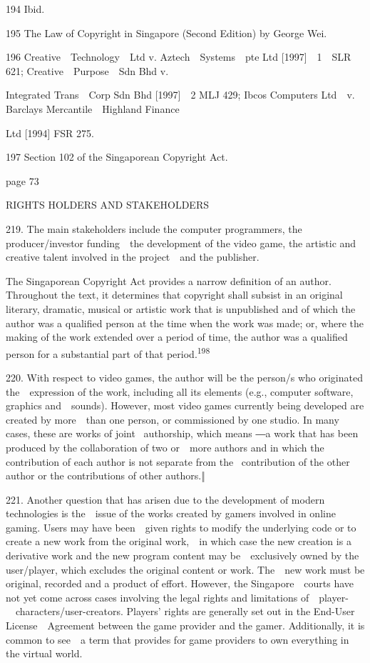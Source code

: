 \documentclass[
]{article}
\begin{document}
{194 }{Ibid.}

{195 }{The Law of Copyright in Singapore (Second Edition) }{by George
Wei.}

{196 }{Creative~~Technology~~Ltd v. Aztech~~Systems~~pte Ltd
}{{[}1997{]}~~1~~SLR 621; }{Creative~~Purpose~~Sdn Bhd v.}

{Integrated Trans~~Corp Sdn Bhd }{{[}1997{]}~~2 MLJ 429; }{Ibcos
Computers Ltd~~v. Barclays Mercantile~~Highland Finance}

{Ltd }{{[}1994{]} FSR 275.}

{197 }{Section 102 of the Singaporean }{Copyright Act}{.}

{page 73}

{RIGHTS HOLDERS AND STAKEHOLDERS}

{219. }{The main stakeholders include the computer programmers, the
producer/investor funding~~the development of the video game, the
artistic and creative talent involved in the project~~and the
publisher.}

{The Singaporean }{Copyright Act }{provides a narrow definition of an
author. Throughout the text, it determines that copyright shall subsist
in an original literary, dramatic, musical or artistic work that is
unpublished and of which the author was a qualified person at the time
when the work was made; or, where the making of the work extended over a
period of time, the author was a qualified person for a substantial part
of that period.}\textsuperscript{{198}}

{220. }{With respect to video games, the author will be the person/s who
originated the~~expression of the work, including all its elements
(e.g., computer software, graphics and~~sounds). However, most video
games currently being developed are created by more~~than one person, or
commissioned by one studio. In many cases, these are works of joint
}{~authorship, which means ―}{a work that has been produced by the
collaboration of two or~~more authors and in which the contribution of
each author is not separate from the }{~contribution of the other author
or the contributions of other authors.‖}

{221. }{Another question that has arisen due to the development of
modern technologies is the~~issue of the works created by gamers
involved in online gaming. Users may have been~~given rights to modify
the underlying code or to create a new work from the original work,~~in
which case the new creation is a derivative work and the new program
content may be~~exclusively owned by the user/player, which excludes the
original content or work. The~~new work must be original, recorded and a
product of effort. However, the Singapore~~courts have not yet come
across cases involving the legal rights and limitations
of~~player-~~characters/user-creators. }{Players' rights are generally
set out in the End}{-User License~~Agreement between the game provider
and the gamer. Additionally, it is common to see~~a term that provides
for game providers to own everything in the virtual world.}
\end{document}
